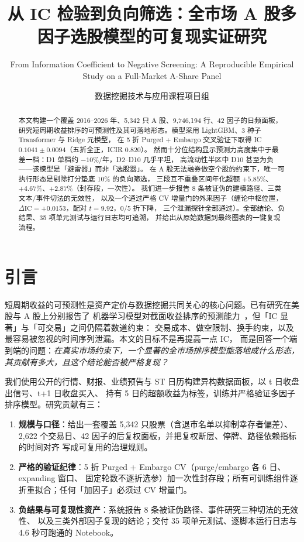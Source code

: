 \documentclass[sigconf]{acmart}
\title{从 IC 检验到负向筛选：全市场 A 股多因子选股模型的可复现实证研究}
\subtitle{From Information Coefficient to Negative Screening: A Reproducible Empirical Study on a Full-Market A-Share Panel}
\author{数据挖掘技术与应用课程项目组}
\affiliation{%
  \institution{中国石油大学（北京）克拉玛依校区}
  \country{中国}
}
\begin{document}
\begin{abstract}
本文构建一个覆盖 2016--2026 年、5{,}342 只 A 股、9{,}746{,}194 行、42 因子的日频面板，
研究短周期收益排序的可预测性及其可落地形态。模型采用 LightGBM、3 种子 Transformer 与 Ridge 元模型，
在 5 折 Purged + Embargo 交叉验证下取得 IC $0.1041 \pm 0.0094$（五折全正，ICIR 0.820）。
然而十分位结构显示预测力高度集中于最差一档：D1 单档约 $-10\%/$年，D2--D10 几乎平坦，
高流动性半区中 D10 甚至为负——该模型是「避雷器」而非「选股器」。
在 A 股无法融券做空个股的约束下，唯一可执行形态是剔除打分垫底 10\% 的负向筛选，
三段互不重叠区间年化超额 $+5.85\%$、$+4.67\%$、$+2.87\%$（封存段，一次性）。
我们进一步报告 8 条被证伪的建模路径、三类文本/事件切法的无效性，
以及一个通过严格 CV 增量门的外来因子（缠论中枢位置，$\Delta\mathrm{IC}=+0.0153$，配对 $t=9.92$，0/5 折下降，
三个泄漏探针全部通过）。全部结论、负结果、35 项单元测试与运行日志均可追溯，
并给出从原始数据到最终图表的一键复现流程。
\end{abstract}


\maketitle

\section{引言}

短周期收益的可预测性是资产定价与数据挖掘共同关心的核心问题。已有研究在美股与 A 股上分别报告了
机器学习模型对截面收益排序的预测能力~\cite{gu2020,ke2017}，但「IC 显著」与「可交易」之间仍隔着数道约束：
交易成本、做空限制、换手约束，以及最容易被忽视的时间序列泄漏。本文的目标不是再提高一点 IC，
而是回答一个端到端的问题：\emph{在真实市场约束下，一个显著的全市场排序模型能落地成什么形态，
其贡献有多大，且这个结论能否被严格复现？}

我们使用公开的行情、财报、业绩预告与 ST 日历构建异构数据面板，以 t 日收盘出信号、t+1 日收盘买入、
持有 5 日的超额收益为标签，训练并严格验证多因子排序模型。研究贡献有三：

\begin{enumerate}
  \item \textbf{规模与口径}：给出一套覆盖 5{,}342 只股票（含退市名单以抑制幸存者偏差）、
  2{,}622 个交易日、42 因子的后复权面板，并把复权断层、停牌、路径依赖指标的时间对齐
  写成可复用的治理规则。
  \item \textbf{严格的验证纪律}：5 折 Purged + Embargo CV（purge/embargo 各 6 日、expanding 窗口、
  固定轮数不逐折选参）加一次性封存段；所有可训练组件逐折重拟合；任何「加因子」必须过 CV 增量门。
  \item \textbf{负结果与可复现性资产}：系统报告 8 条被证伪路径、事件研究三种切法的无效性、
  以及三类外部因子复现的结论；交付 35 项单元测试、逐脚本运行日志与 4.6 秒可跑通的 Notebook。
\end{enumerate}
\end{document}
